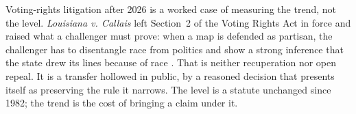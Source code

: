 
Voting-rights litigation after 2026 is a worked case of measuring the trend, not the level. \emph{Louisiana v. Callais} left Section~2 of the Voting Rights Act in force and raised what a challenger must prove: when a map is defended as partisan, the challenger has to disentangle race from politics and show a strong inference that the state drew its lines because of race \autocite{callais2026}.
That is neither recuperation nor open repeal. It is a transfer hollowed in public, by a reasoned decision that presents itself as preserving the rule it narrows. The level is a statute unchanged since 1982; the trend is the cost of bringing a claim under it.
